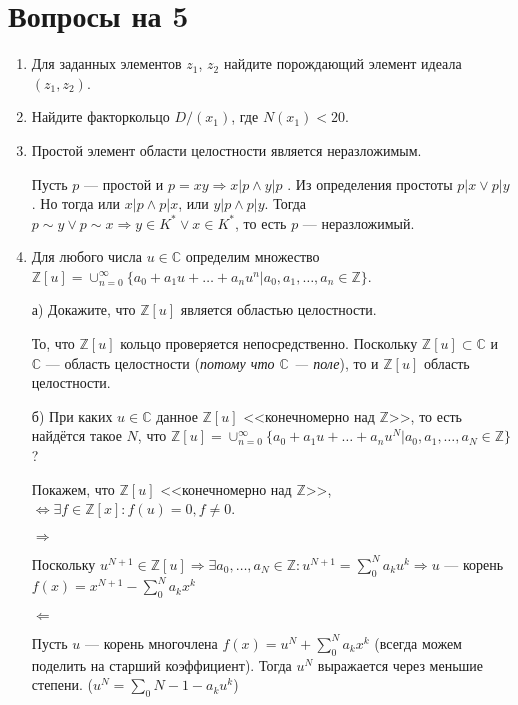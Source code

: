 \documentclass[../main.tex]{subfiles}
\begin{document}
\section{Вопросы на 5}

\begin{enumerate}

\item Для заданных элементов $z_1$, $z_2$ найдите порождающий элемент идеала $(z_1, z_2)$.

\item Найдите факторкольцо $D/(x_1)$, где $N(x_1) < 20$.

\item Простой элемент области целостности является неразложимым.

Пусть $p$ --- простой и $p = xy \Rightarrow x | p \land y | p$ . Из определения простоты $p | x \lor p | y$. Но тогда или $x | p \land p | x$, или $y | p \land p | y$. Тогда $p \sim y \lor p \sim x \Rightarrow y \in K^* \lor x \in K^*$, то есть $p$ --- неразложимый.

\item Для любого числа $u \in \mathbb{C}$ определим множество $\mathbb{Z}[u] = \cup_{n = 0}^{\infty} \{a_0 + a_1u + \ldots + a_nu^n | a_0, a_1, \ldots, a_n \in \mathbb{Z}\}$.

а) Докажите, что $\mathbb{Z}[u]$ является областью целостности.

То, что $\mathbb{Z}[u]$ кольцо проверяется непосредственно. Поскольку $\mathbb{Z}[u] \subset \mathbb{C}$ и $\mathbb{C}$ --- область целостности (\textit{потому что $\mathbb{C}$ --- поле}), то и $\mathbb{Z}[u]$ область целостности.

б) При каких $u \in \mathbb{C}$ данное $\mathbb{Z}[u]$ <<конечномерно над $\mathbb{Z}$>>, то есть найдётся такое $N$, что $\mathbb{Z}[u] = \cup_{n = 0}^{\infty} \{a_0 + a_1u + \ldots + a_nu^N | a_0, a_1, \ldots, a_N \in \mathbb{Z}\}$?

Покажем, что $\mathbb{Z}[u]$ <<конечномерно над $\mathbb{Z}$>>, $ \Leftrightarrow \exists f \in \mathbb{Z}[x]: f(u) = 0, f \ne 0$.

$\Rightarrow$

    Поскольку $u^{N + 1} \in \mathbb{Z}[u] \Rightarrow \exists a_0, \ldots, a_N \in \mathbb{Z}: u^{N + 1} = \sum\limits_{0}^{N} a_ku^k \Rightarrow u$ --- корень $f(x) = x^{N + 1} - \sum\limits_{0}^{N} a_kx^k$

$\Leftarrow$

    Пусть $u$ --- корень многочлена $f(x) = u^{N} + \sum\limits_{0}^N a_kx^k$ (всегда можем поделить на старший коэффициент). Тогда $u^N$ выражается через меньшие степени. ($u^N = \sum\limits_{0}{N - 1} -a_ku^k$)


\end{enumerate}
\end{document}
